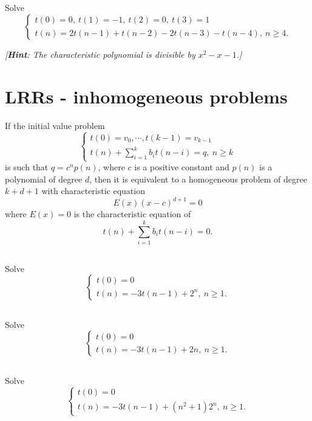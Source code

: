 \documentclass{amsart}
\begin{document}
%

\subsection{} Solve
\[
	\begin{cases}
		t(0)= 0,\ t(1)= -1,\ t(2)= 0,\ t(3)= 1\\
		t(n)= 2t(n-1) + t(n-2) - 2t(n-3) - t(n-4),\ n \geq 4.
	\end{cases}
\]

\textit{[\textbf{Hint}: The characteristic polynomial is divisible by $x^2 - x - 1$.]}

\section{LRRs - inhomogeneous problems}
\begin{thm}
	If the initial value problem
	\begin{displaymath}
		\begin{cases}
			t(0)= v_0, \cdots, t(k-1)= v_{k-1}\\
			t(n)+ \sum_{i= 1}^k b_it(n-i)= q,\ n \geq k
		\end{cases}
	\end{displaymath}
	is such that $q = c^np(n)$, where $c$ is a positive constant and
	$p(n)$ is a polynomial of degree $d$, then it is equivalent to a
	homogeneous problem of degree $k+d+1$ with characteristic equation
	\begin{equation*}
		E(x)(x-c)^{d+1} = 0
	\end{equation*}
	where $E(x) = 0$ is the characteristic equation of
	\[
		t(n) + \sum_{i= 1}^k b_it(n-i)= 0.
	\]
\end{thm}

%

\subsection{} Solve
\[
	\begin{cases}
		t(0)= 0\\
		t(n)= -3t(n-1) + 2^n,\ n\geq 1.
	\end{cases}
\]

%

\subsection{} Solve
\[
	\begin{cases}
		t(0)= 0\\
		t(n)= -3t(n-1) + 2n,\ n\geq 1.
	\end{cases}
\]

\subsection{} Solve
\[
	\begin{cases}
		t(0)= 0\\
		t(n)= -3t(n-1) + (n^2 + 1)2^n,\ n\geq 1.
	\end{cases}
\]
\end{document}
